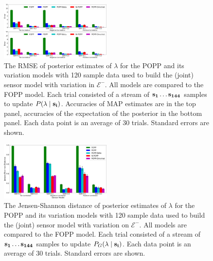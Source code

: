 \begin{figure}[t!]
	\centering
	\includegraphics[width=0.5\textwidth]{./figures/tjnr_comparison_120.png}
    \caption{The RMSE of posterior estimates of $\lambda$ for the POPP and its variation models with 120 sample data used to build the (joint) sensor model with variation in $\mathcal{E^-}$. All models are compared to the FOPP model. Each trial consisted of a stream of $\protect\mathbf{s_1} \ldots \protect\mathbf{s_{144}}$ samples to update $P(\lambda \mid \protect\mathbf{s_i})$. Accuracies of MAP estimates are  in the top panel, accuracies of the expectation of the posterior in the bottom panel. Each data point is an average of 30 trials. Standard errors are shown.} 
	\label{fig:tjnr_comparison_120}
\end{figure}

\begin{figure}[t!]
	\centering
	\includegraphics[width=0.5\textwidth]{./figures/tjnr_comparison_120_kl.png}
	\caption{The Jensen-Shannon distance of posterior estimates of $\lambda$ for the POPP and its variation models with 120 sample data used to build the (joint) sensor model with variation on $\mathcal{E^-}$. All models are compared to the FOPP model. Each trial consisted of a stream of $\protect\mathbf{s_1} \ldots \protect\mathbf{s_{144}}$ samples to update $P_G(\lambda \mid \protect\mathbf{s_i})$. Each data point is an average of 30 trials. Standard errors are shown.} 
	\label{fig:tjnr_comparison_120_kl}
\end{figure}

